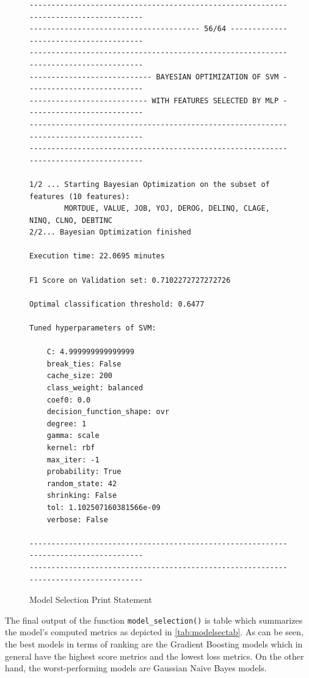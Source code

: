 \begin{figure}[H]
\centering\caption{Model Selection Print Statement}
\label{fig:modselprint}

{\fontsize{8.8}{11}\selectfont 
\begin{verbatim}
-------------------------------------------------------------------------------------
--------------------------------------- 56/64 ---------------------------------------
-------------------------------------------------------------------------------------
---------------------------- BAYESIAN OPTIMIZATION OF SVM ---------------------------
--------------------------- WITH FEATURES SELECTED BY MLP ---------------------------
-------------------------------------------------------------------------------------
------------------------------------------------------------------------------------- 

1/2 ... Starting Bayesian Optimization on the subset of features (10 features):
        MORTDUE, VALUE, JOB, YOJ, DEROG, DELINQ, CLAGE, NINQ, CLNO, DEBTINC
2/2... Bayesian Optimization finished 

Execution time: 22.0695 minutes 

F1 Score on Validation set: 0.7102272727272726 

Optimal classification threshold: 0.6477 

Tuned hyperparameters of SVM: 

    C: 4.999999999999999
    break_ties: False
    cache_size: 200
    class_weight: balanced
    coef0: 0.0
    decision_function_shape: ovr
    degree: 1
    gamma: scale
    kernel: rbf
    max_iter: -1
    probability: True
    random_state: 42
    shrinking: False
    tol: 1.102507160381566e-09
    verbose: False

-------------------------------------------------------------------------------------
------------------------------------------------------------------------------------- 
\end{verbatim}
}
\vspace{0em}
\end{figure}



The final output of the function \lstinline{model_selection()} is table which summarizes the model's computed metrics as depicted in \autoref{tab:modelsectab}. As can be seen, the best models in terms of ranking are the Gradient Boosting models which in general have the highest score metrics and the lowest loss metrics. On the other hand, the worst-performing models are Gaussian Naive Bayes models.


